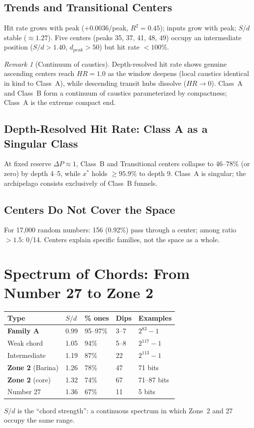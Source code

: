 \documentclass[12pt,a4paper]{article}
\theoremstyle{remark}
\newtheorem{remark}[theorem]{Remark}
\begin{document}
\subsection{Trends and Transitional Centers}
Hit rate grows with peak ($+0.0036$/peak, $R^2=0.45$); inputs grow with peak; $S/d$ stable ($\approx1.27$). Five centers (peaks 35, 37, 41, 48, 49) occupy an intermediate position ($S/d>1.40$, $d_{peak}>50$) but hit rate $<100\%$.
\begin{remark}[Continuum of caustics]
Depth-resolved hit rate shows genuine ascending centers reach $HR=1.0$ as the window deepens (local caustics identical in kind to Class~A), while descending transit hubs dissolve ($HR\to0$). Class~A and Class~B form a continuum of caustics parameterized by compactness; Class~A is the extreme compact end.
\end{remark}

\subsection{Depth-Resolved Hit Rate: Class A as a Singular Class}
At fixed reserve $\Delta P\approx1$, Class~B and Transitional centers collapse to 46--78\% (or zero) by depth 4--5, while $x^*$ holds $\ge95.9\%$ to depth 9. Class~A is singular; the archipelago consists exclusively of Class~B funnels.

\subsection{Centers Do Not Cover the Space}
For 17,000 random numbers: 156 (0.92\%) pass through a center; among ratio $>1.5$: 0/14. Centers explain specific families, not the space as a whole.

\section{Spectrum of Chords: From Number 27 to Zone 2}
\begin{table}[h]
\centering
\begin{tabular}{lllll}
\toprule
\textbf{Type} & $S/d$ & \textbf{\% ones} & \textbf{Dips} & \textbf{Examples} \\
\midrule
\textbf{Family A} & 0.99 & 95--97\% & 3--7 & $2^{83}-1$ \\
Weak chord & 1.05 & 94\% & 5--8 & $2^{117}-1$ \\
Intermediate & 1.19 & 87\% & 22 & $2^{113}-1$ \\
\textbf{Zone 2} (Barina) & 1.26 & 78\% & 47 & 71 bits \\
\textbf{Zone 2} (core) & 1.32 & 74\% & 67 & 71--87 bits \\
Number 27 & 1.36 & 67\% & 11 & 5 bits \\
\bottomrule
\end{tabular}
\end{table}
$S/d$ is the ``chord strength'': a continuous spectrum in which Zone~2 and 27 occupy the same range.
\end{document}
